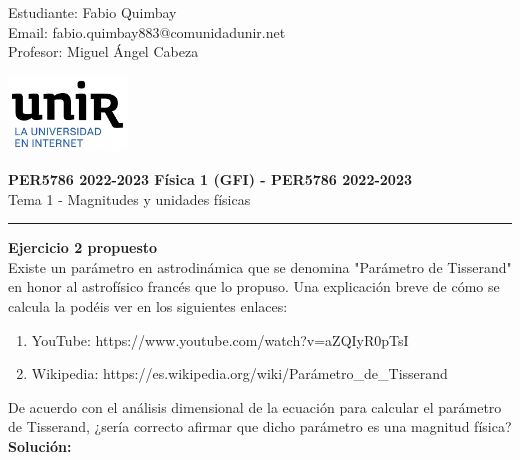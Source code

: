 \documentclass[11pt,letterpaper]{article}
\begin{document}
\pagestyle{plain}

\begin{flushleft}
Estudiante: Fabio Quimbay\\
Email: fabio.quimbay883@comunidadunir.net\\
Profesor: Miguel Ángel Cabeza\\
\end{flushleft}

\begin{flushright}\vspace{-20mm}
\includegraphics[height=2cm]{logo.png}
\end{flushright}
 
\begin{center}\vspace{0cm}
\textbf{\large PER5786 2022-2023  Física 1 (GFI) - PER5786 2022-2023}\\
 Tema 1 - Magnitudes y unidades físicas
\end{center}

 
\rule{\linewidth}{0.1mm}

\bigskip
\bigskip

\textbf{Ejercicio 2 propuesto}\\

Existe un parámetro en astrodinámica que se denomina "Parámetro de Tisserand" en honor al astrofísico francés que lo propuso. Una explicación breve de cómo se calcula la podéis ver en los siguientes enlaces:

\begin{enumerate}

	\item YouTube: https://www.youtube.com/watch?v=aZQIyR0pTsI
	\item Wikipedia: https://es.wikipedia.org/wiki/Parámetro\_de\_Tisserand
	
\end{enumerate}	

De acuerdo con el análisis dimensional de la ecuación para calcular el parámetro de Tisserand, ¿sería correcto afirmar que dicho parámetro es una magnitud física?\\

\textbf{Solución:}\\
\end{document}
